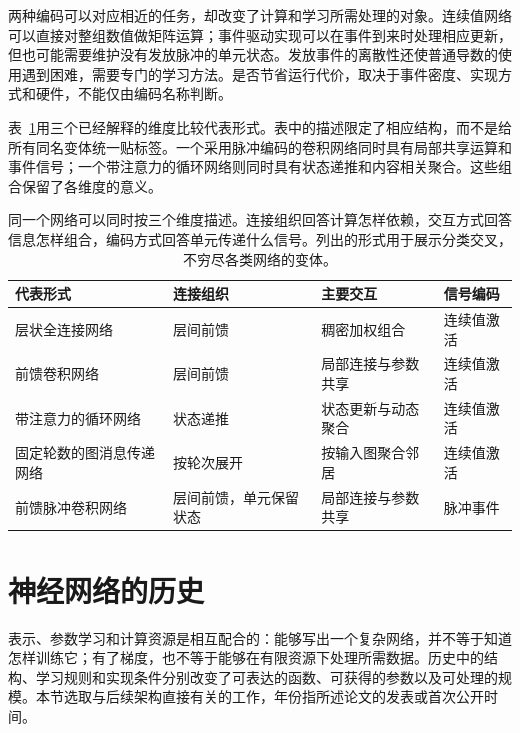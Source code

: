 两种编码可以对应相近的任务，却改变了计算和学习所需处理的对象。连续值网络可以直接对整组数值做矩阵运算；事件驱动实现可以在事件到来时处理相应更新，但也可能需要维护没有发放脉冲的单元状态。发放事件的离散性还使普通导数的使用遇到困难，需要专门的学习方法。是否节省运行代价，取决于事件密度、实现方式和硬件，不能仅由编码名称判断。

表~\ref{tab:neural-cross-classification}用三个已经解释的维度比较代表形式。表中的描述限定了相应结构，而不是给所有同名变体统一贴标签。一个采用脉冲编码的卷积网络同时具有局部共享运算和事件信号；一个带注意力的循环网络则同时具有状态递推和内容相关聚合。这些组合保留了各维度的意义。

\begin{table}[htbp]
  \centering
  \small
  \begin{tabularx}{\linewidth}{@{}>{\RaggedRight\arraybackslash}p{45mm}>{\RaggedRight\arraybackslash}p{42mm}>{\RaggedRight\arraybackslash}X>{\RaggedRight\arraybackslash}p{26mm}@{}}
    \toprule
    \textbf{代表形式} & \textbf{连接组织} & \textbf{主要交互} & \textbf{信号编码} \\
    \midrule
    层状全连接网络 & 层间前馈 & 稠密加权组合 & 连续值激活 \\
    前馈卷积网络 & 层间前馈 & 局部连接与参数共享 & 连续值激活 \\
    带注意力的循环网络 & 状态递推 & 状态更新与动态聚合 & 连续值激活 \\
    固定轮数的图消息传递网络 & 按轮次展开 & 按输入图聚合邻居 & 连续值激活 \\
    前馈脉冲卷积网络 & 层间前馈，单元保留状态 & 局部连接与参数共享 & 脉冲事件 \\
    \bottomrule
  \end{tabularx}
  \caption{同一个网络可以同时按三个维度描述。连接组织回答计算怎样依赖，交互方式回答信息怎样组合，编码方式回答单元传递什么信号。列出的形式用于展示分类交叉，不穷尽各类网络的变体。}
  \label{tab:neural-cross-classification}
\end{table}

\FloatBarrier
\section{神经网络的历史}
\label{sec:neural-history}

表示、参数学习和计算资源是相互配合的：能够写出一个复杂网络，并不等于知道怎样训练它；有了梯度，也不等于能够在有限资源下处理所需数据。历史中的结构、学习规则和实现条件分别改变了可表达的函数、可获得的参数以及可处理的规模。本节选取与后续架构直接有关的工作，年份指所述论文的发表或首次公开时间。

